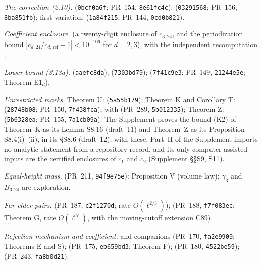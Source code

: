 {\begin{enumerate}[label={[R\arabic*]}, ref={R\arabic*}, leftmargin=3.2em, itemsep=2pt]
\item\label{rec:eps} \emph{The correction (2.10).}  (\texttt{0bcf0a6f}; PR~154, \texttt{8e61fc4c});  (\texttt{03291568}; PR~156, \texttt{8ba851fb}); first variation:  (\texttt{1a84f215}; PR~144, \texttt{0cd0b821}).
\item\label{rec:v1coef} \emph{Coefficient enclosure.}  (a twenty-digit enclosure of $c_{3,24}$, and the periodization bound $|c_{d,24}/c_{d,\mathrm{ref}}-1|<10^{-106}$ for $d=2,3$), with the independent recomputation .
\item\label{rec:lower} \emph{Lower bound (3.13a).}  (\texttt{aaefc8da});  (\texttt{7303bd79});  (\texttt{7f41c9e3}; PR~149, \texttt{21244e5e}; Theorem E1$_d$).
\item\label{rec:unres} \emph{Unrestricted marks.} Theorem U:  (\texttt{5a55b179}); Theorem K and Corollary T:  (\texttt{28748b08}; PR~150, \texttt{7f438fca}), with  (PR~289, \texttt{5b012335}); Theorem Z:  (\texttt{5b6328ea}; PR~155, \texttt{7a1cb09a}). The Supplement proves the bound (K2) of Theorem~K as its Lemma S8.16 (draft~11) and Theorem~Z as its Proposition S8.4(i)--(ii), in its \S S8.6 (draft~12); with these, Part~II of the Supplement imports no analytic statement from a repository record, and its only computer-assisted inputs are the certified enclosures of $c_1$ and $c_2$ (Supplement \S\S S9, S11).
\item\label{rec:eqh} \emph{Equal-height mass.}  (PR~211, \texttt{94f9e75e}): Proposition V (volume law); $\gamma_3$ and $B_{3,24}$ are exploration.
\item\label{rec:far} \emph{Far elder pairs.}  (PR~187, \texttt{c2f1270d}; rate $O(\ell^{2/3})$);  (PR~188, \texttt{f7f083ec}; Theorem G, rate $O(\ell^N)$, with the moving-cutoff extension C89).
\item\label{rec:mech} \emph{Rejection mechanism and coefficient.}  and companions (PR~170, \texttt{fa2e9909}; Theorems E and S);  (PR~175, \texttt{eb659bd3}; Theorem F);  (PR~180, \texttt{4522be59});  (PR~243, \texttt{fa8b0d21}).

\end{enumerate}}
